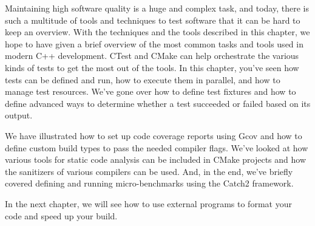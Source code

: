 Maintaining high software quality is a huge and complex task, and today, there is such a multitude of tools and techniques to test software that it can be hard to keep an overview. With the techniques and the tools described in this chapter, we hope to have given a brief overview of the most common tasks and tools used in modern C++ development. CTest and CMake can help orchestrate the various kinds of tests to get the most out of the tools. In this chapter, you've seen how tests can be defined and run, how to execute them in parallel, and how to manage test resources. We've gone over how to define test fixtures and how to define advanced ways to determine whether a test succeeded or failed based on its output.

We have illustrated how to set up code coverage reports using Gcov and how to define custom build types to pass the needed compiler flags. We've looked at how various tools for static code analysis can be included in CMake projects and how the sanitizers of various compilers can be used. And, in the end, we've briefly covered defining and running micro-benchmarks using the Catch2 framework.

In the next chapter, we will see how to use external programs to format your code and speed up your build.